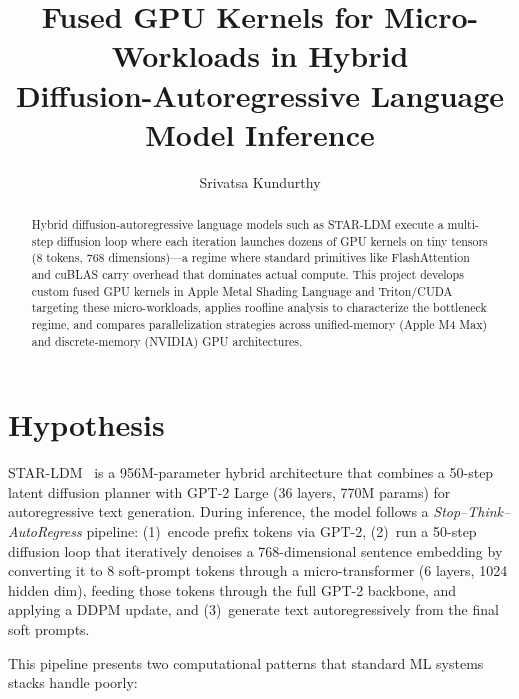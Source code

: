 \documentclass[sigconf,authordraft]{acmart}
\begin{document}
\title{Fused GPU Kernels for Micro-Workloads in Hybrid\\Diffusion-Autoregressive Language Model Inference}

\author{Srivatsa Kundurthy}

\renewcommand{\shortauthors}{Kundurthy}

\begin{abstract}
Hybrid diffusion-autoregressive language models such as STAR-LDM execute a multi-step diffusion loop where each iteration launches dozens of GPU kernels on tiny tensors (8 tokens, 768 dimensions)---a regime where standard primitives like FlashAttention and cuBLAS carry overhead that dominates actual compute. This project develops custom fused GPU kernels in Apple Metal Shading Language and Triton/CUDA targeting these micro-workloads, applies roofline analysis to characterize the bottleneck regime, and compares parallelization strategies across unified-memory (Apple M4 Max) and discrete-memory (NVIDIA) GPU architectures.
\end{abstract}

\maketitle

\section{Hypothesis}

STAR-LDM~\cite{lovelace2025star} is a 956M-parameter hybrid architecture that combines a 50-step latent diffusion planner with GPT-2 Large (36 layers, 770M params) for autoregressive text generation. During inference, the model follows a \textit{Stop--Think--AutoRegress} pipeline: (1)~encode prefix tokens via GPT-2, (2)~run a 50-step diffusion loop that iteratively denoises a 768-dimensional sentence embedding by converting it to 8 soft-prompt tokens through a micro-transformer (6 layers, 1024 hidden dim), feeding those tokens through the full GPT-2 backbone, and applying a DDPM update, and (3)~generate text autoregressively from the final soft prompts.

This pipeline presents two computational patterns that standard ML systems stacks handle poorly:
\end{document}
